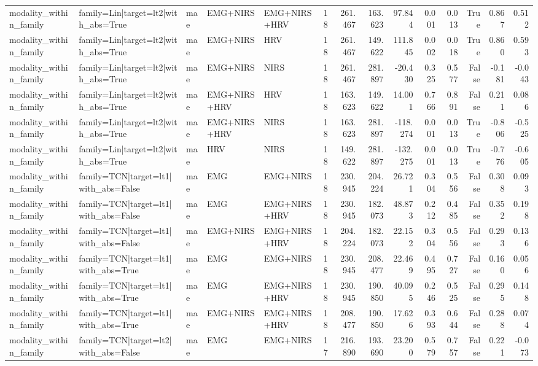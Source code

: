 \begin{table}
\begin{tabular}{lllllrrrrrrrrr}
modality_within_family & family=Lin|target=lt2|with_abs=True & mae & EMG+NIRS & EMG+NIRS+HRV & 18 & 261.467 & 163.623 & 97.844 & 0.001 & 0.013 & True & 0.867 & 0.512 \\
modality_within_family & family=Lin|target=lt2|with_abs=True & mae & EMG+NIRS & HRV & 18 & 261.467 & 149.622 & 111.845 & 0.002 & 0.018 & True & 0.860 & 0.593 \\
modality_within_family & family=Lin|target=lt2|with_abs=True & mae & EMG+NIRS & NIRS & 18 & 261.467 & 281.897 & -20.430 & 0.325 & 0.577 & False & -0.181 & -0.043 \\
modality_within_family & family=Lin|target=lt2|with_abs=True & mae & EMG+NIRS+HRV & HRV & 18 & 163.623 & 149.622 & 14.001 & 0.766 & 0.891 & False & 0.211 & 0.086 \\
modality_within_family & family=Lin|target=lt2|with_abs=True & mae & EMG+NIRS+HRV & NIRS & 18 & 163.623 & 281.897 & -118.274 & 0.001 & 0.013 & True & -0.806 & -0.525 \\
modality_within_family & family=Lin|target=lt2|with_abs=True & mae & HRV & NIRS & 18 & 149.622 & 281.897 & -132.275 & 0.001 & 0.013 & True & -0.776 & -0.605 \\
modality_within_family & family=TCN|target=lt1|with_abs=False & mae & EMG & EMG+NIRS & 18 & 230.945 & 204.224 & 26.721 & 0.304 & 0.556 & False & 0.308 & 0.093 \\
modality_within_family & family=TCN|target=lt1|with_abs=False & mae & EMG & EMG+NIRS+HRV & 18 & 230.945 & 182.073 & 48.873 & 0.212 & 0.485 & False & 0.352 & 0.198 \\
modality_within_family & family=TCN|target=lt1|with_abs=False & mae & EMG+NIRS & EMG+NIRS+HRV & 18 & 204.224 & 182.073 & 22.152 & 0.304 & 0.556 & False & 0.293 & 0.136 \\
modality_within_family & family=TCN|target=lt1|with_abs=True & mae & EMG & EMG+NIRS & 18 & 230.945 & 208.477 & 22.469 & 0.495 & 0.727 & False & 0.160 & 0.056 \\
modality_within_family & family=TCN|target=lt1|with_abs=True & mae & EMG & EMG+NIRS+HRV & 18 & 230.945 & 190.850 & 40.095 & 0.246 & 0.525 & False & 0.295 & 0.148 \\
modality_within_family & family=TCN|target=lt1|with_abs=True & mae & EMG+NIRS & EMG+NIRS+HRV & 18 & 208.477 & 190.850 & 17.626 & 0.393 & 0.644 & False & 0.288 & 0.074 \\
modality_within_family & family=TCN|target=lt2|with_abs=False & mae & EMG & EMG+NIRS & 17 & 216.890 & 193.690 & 23.200 & 0.579 & 0.757 & False & 0.221 & -0.073 \\

\end{tabular}
\end{table}
